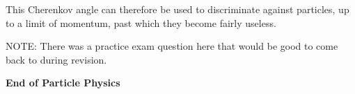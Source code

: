 This Cherenkov angle can therefore be used to discriminate against particles, up to a limit of momentum, past which they become fairly useless.

\begin{tcolorbox}
    NOTE: There was a practice exam question here that would be good to come back to during revision.
\end{tcolorbox}

\vspace{1cm}

\begin{center}
    \large \textbf{End of Particle Physics}
\end{center}
